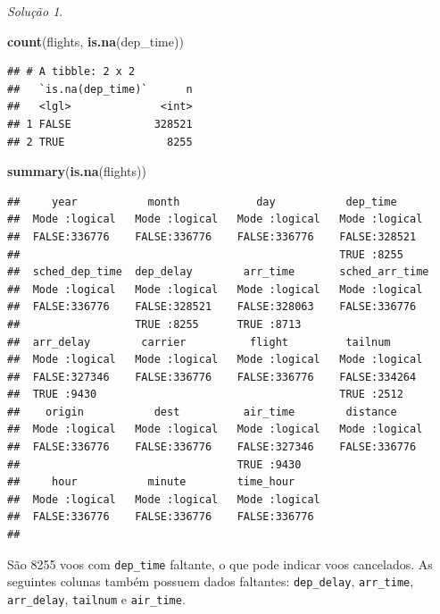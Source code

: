 \documentclass[
]{latex/krantz}
\newenvironment{Shaded}{\begin{snugshade}}{\end{snugshade}}
\newcommand{\FunctionTok}[1]{\textcolor[rgb]{0.13,0.29,0.53}{\textbf{#1}}}
\newcommand{\NormalTok}[1]{#1}
\theoremstyle{definition}
\theoremstyle{definition}
\theoremstyle{definition}
\theoremstyle{definition}
\theoremstyle{remark}
\newtheorem*{solution}{Solução}
\begin{document}
\begin{solution}
\leavevmode

\begin{Shaded}
\begin{Highlighting}[]
\FunctionTok{count}\NormalTok{(flights, }\FunctionTok{is.na}\NormalTok{(dep\_time))}
\end{Highlighting}
\end{Shaded}

\begin{verbatim}
## # A tibble: 2 x 2
##   `is.na(dep_time)`      n
##   <lgl>              <int>
## 1 FALSE             328521
## 2 TRUE                8255
\end{verbatim}

\begin{Shaded}
\begin{Highlighting}[]
\FunctionTok{summary}\NormalTok{(}\FunctionTok{is.na}\NormalTok{(flights))}
\end{Highlighting}
\end{Shaded}

\begin{verbatim}
##     year           month            day           dep_time      
##  Mode :logical   Mode :logical   Mode :logical   Mode :logical  
##  FALSE:336776    FALSE:336776    FALSE:336776    FALSE:328521   
##                                                  TRUE :8255     
##  sched_dep_time  dep_delay        arr_time       sched_arr_time 
##  Mode :logical   Mode :logical   Mode :logical   Mode :logical  
##  FALSE:336776    FALSE:328521    FALSE:328063    FALSE:336776   
##                  TRUE :8255      TRUE :8713                     
##  arr_delay        carrier          flight         tailnum       
##  Mode :logical   Mode :logical   Mode :logical   Mode :logical  
##  FALSE:327346    FALSE:336776    FALSE:336776    FALSE:334264   
##  TRUE :9430                                      TRUE :2512     
##    origin           dest          air_time        distance      
##  Mode :logical   Mode :logical   Mode :logical   Mode :logical  
##  FALSE:336776    FALSE:336776    FALSE:327346    FALSE:336776   
##                                  TRUE :9430                     
##     hour           minute        time_hour      
##  Mode :logical   Mode :logical   Mode :logical  
##  FALSE:336776    FALSE:336776    FALSE:336776   
## 
\end{verbatim}

São 8255 voos com \texttt{dep\_time} faltante, o que pode indicar voos cancelados. As seguintes colunas também possuem dados faltantes: \texttt{dep\_delay}, \texttt{arr\_time}, \texttt{arr\_delay}, \texttt{tailnum} e \texttt{air\_time}.

\end{solution}
\end{document}

